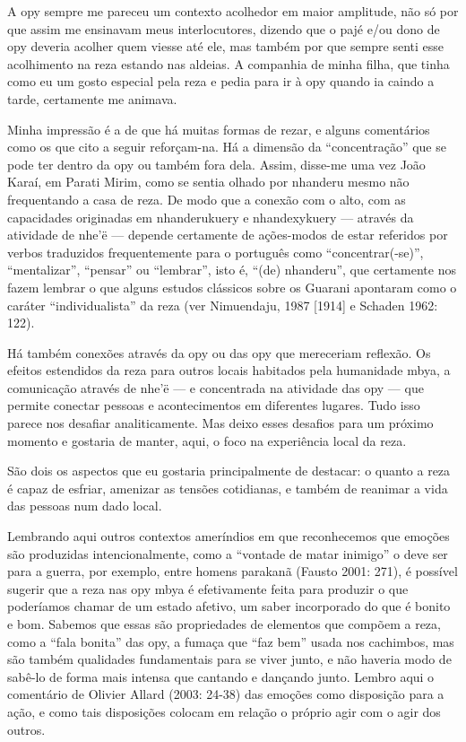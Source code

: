 A opy sempre me pareceu um contexto acolhedor em maior amplitude, não só
por que assim me ensinavam meus interlocutores, dizendo que o pajé e/ou
dono de opy deveria acolher quem viesse até ele, mas também por que
sempre senti esse acolhimento na reza estando nas aldeias. A companhia
de minha filha, que tinha como eu um gosto especial pela reza e pedia
para ir à opy quando ia caindo a tarde, certamente me animava.

Minha impressão é a de que há muitas formas de rezar, e alguns
comentários como os que cito a seguir reforçam-na. Há a dimensão da
``concentração'' que se pode ter dentro da opy ou também fora dela.
Assim, disse-me uma vez João Karaí, em Parati Mirim, como se sentia
olhado por nhanderu mesmo não frequentando a casa de reza. De modo que
a conexão com o alto, com as capacidades originadas em nhanderukuery e
nhandexykuery --- através da atividade de nhe’ë --- depende certamente de
ações-modos de estar referidos por verbos traduzidos frequentemente
para o português como ``concentrar(-se)'',  ``mentalizar'', ``pensar'' ou
``lembrar'', isto é, ``(de) nhanderu'', que certamente nos fazem lembrar o
que alguns estudos clássicos sobre os Guarani apontaram como o caráter
``individualista'' da reza (ver Nimuendaju, 1987 [1914] e Schaden 1962:
122). 

Há também conexões através da opy ou das opy que mereceriam reflexão. Os
efeitos estendidos da reza para outros locais habitados pela humanidade
mbya, a comunicação através de nhe’ë --- e concentrada na atividade das
opy --- que permite conectar pessoas e acontecimentos em diferentes
lugares. Tudo isso parece nos desafiar analiticamente. Mas deixo esses
desafios para um próximo momento e gostaria de manter, aqui, o foco na
experiência local da reza.

São dois os aspectos que eu gostaria principalmente de destacar: o
quanto a reza é capaz de esfriar, amenizar as tensões cotidianas, e
também de reanimar a vida das pessoas num dado local.

Lembrando aqui outros contextos ameríndios em que reconhecemos que
emoções são produzidas intencionalmente, como a ``vontade de matar
inimigo'' o deve ser para a guerra, por exemplo, entre homens parakanã
(Fausto 2001: 271), é possível sugerir que a reza nas opy mbya é
efetivamente feita para produzir o que poderíamos chamar de um estado
afetivo, um saber incorporado do que é bonito e bom. Sabemos que essas
são propriedades de elementos que compõem a reza, como a ``fala bonita''
das opy, a fumaça que ``faz bem'' usada nos cachimbos, mas são também
qualidades fundamentais para se viver junto, e não haveria modo de
sabê-lo de forma mais intensa que cantando e dançando junto. Lembro
aqui o comentário de Olivier Allard (2003: 24-38) das emoções como
disposição para a ação, e como tais disposições colocam em relação o
próprio agir com o agir dos outros.

